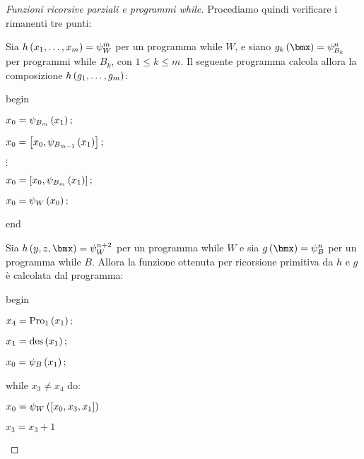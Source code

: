 \documentclass{lectures}
\begin{document}
\begin{multicols}{2}
\begin{proof}[Funzioni ricorsive parziali e programmi while]
        Procediamo quindi verificare i rimanenti tre punti:
        \begin{description}
            \item[Composizione:] Sia \(h\left(x_1, \ldots, x_m\right) = \psi_W^m\) per un programma while \(W\), e siano \(g_k\rnd{\bmx} = \psi^n_{B_k}\) per programmi while \(B_k\), con \(1 \leq k \leq m\). Il seguente programma calcola allora la composizione \(h\left(g_1, \ldots, g_m\right)\):
            \begin{description}
                \item begin
                \begin{description}
                    \item \(x_0 = \psi_{B_m}\left(x_1\right);\)
                    \item \(x_0 = \left[x_0, \psi_{B_{m-1}}\left(x_1\right)\right];\)
                    \item \(\vdots\)
                    \item \(x_0 = \left[x_0, \psi_{B_{m}}\left(x_1\right)\right];\)
                    \item \(x_0 = \psi_{W}\left(x_0\right);\)
                \end{description}
                \item end
            \end{description}
            \item[Ricorsione primitiva:] Sia \(h\rnd{y,z,\bmx} = \psi_W^{n+2}\) per un programma while \(W\) e sia \(g\rnd{\bmx} = \psi_B^n\) per un programma while \(B\). Allora la funzione ottenuta per ricorsione primitiva da \(h\) e \(g\) è calcolata dal programma:
            \begin{description}
                \item begin
                \begin{description}
                    \item \(x_4 = \text{Pro}_{1}\left(x_1\right);\)
                    \item \(x_1 = \text{des}\left(x_1\right);\)
                    \item \(x_0 = \psi_B\left(x_1\right);\)
                    \item while \(x_3 \neq x_4\) do:
                    \begin{description}
                        \item \(x_0 = \psi_W\left(\left[x_0, x_3, x_1\right]\right)\)
                        \item \(x_3 = x_3 + 1\)
                    \end{description}

\end{description}
\end{description}
\end{description}
\end{proof}
\end{multicols}
\end{document}
